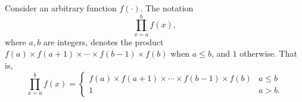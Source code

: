 \begin{note}
  Consider an arbitrary function $f(\cdot)$. The notation
  $$\prod_{x = a}^b f(x),$$
  where $a, b$ are integers,
  denotes the product $f(a) \times f(a + 1) \times \cdots \times f(b - 1) \times f(b)$
  when $a \le b$, and $1$ otherwise. That is,
  $$\prod_{x = a}^b f(x) = 
  \begin{cases}
    f(a) \times f(a + 1) \times \cdots \times f(b - 1) \times f(b) & a \le b\\
    1 & a > b.
  \end{cases}$$%
\end{note}
